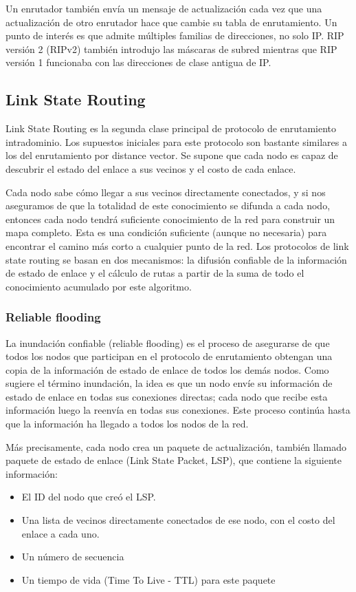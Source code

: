 Un enrutador también envía un mensaje de actualización cada vez que una actualización de otro enrutador hace que cambie su tabla de enrutamiento. Un punto de interés es que admite múltiples familias de direcciones, no solo IP. RIP versión 2 (RIPv2) también introdujo las máscaras de subred mientras que RIP versión 1 funcionaba con las direcciones de clase antigua de IP.

\subsection{Link State Routing}
Link State Routing es la segunda clase principal de protocolo de enrutamiento intradominio. Los supuestos iniciales para este protocolo son bastante similares a los del enrutamiento por distance vector. Se supone que cada nodo es capaz de descubrir el estado del enlace a sus vecinos y el costo de cada enlace.

Cada nodo sabe cómo llegar a sus vecinos directamente conectados, y si nos aseguramos de que la totalidad de este conocimiento se difunda a cada nodo, entonces cada nodo tendrá suficiente conocimiento de la red para construir un mapa completo. Esta es una condición suficiente (aunque no necesaria) para encontrar el camino más corto a cualquier punto de la red. Los protocolos de link state routing se basan en dos mecanismos: la difusión confiable de la información de estado de enlace y el cálculo de rutas a partir de la suma de todo el conocimiento acumulado por este algoritmo.

\subsubsection{Reliable flooding}
La inundación confiable (reliable flooding) es el proceso de asegurarse de que todos los nodos que participan en el protocolo de enrutamiento obtengan una copia de la información de estado de enlace de todos los demás nodos. Como sugiere el término inundación, la idea es que un nodo envíe su información de estado de enlace en todas sus conexiones directas; cada nodo que recibe esta información luego la reenvía en todas sus conexiones. Este proceso continúa hasta que la información ha llegado a todos los nodos de la red.

Más precisamente, cada nodo crea un paquete de actualización, también llamado paquete de estado de enlace (Link State Packet, LSP), que contiene la siguiente información:

\begin{itemize}
  \item El ID del nodo que creó el LSP.
  \item Una lista de vecinos directamente conectados de ese nodo, con el costo del enlace a cada uno.
  \item Un número de secuencia
  \item Un tiempo de vida (Time To Live - TTL) para este paquete
\end{itemize}

